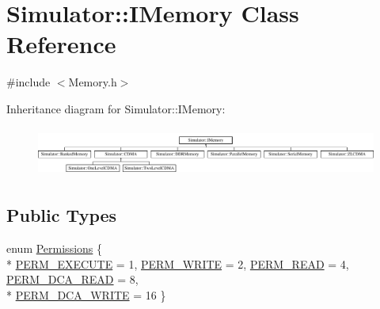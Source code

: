 \hypertarget{class_simulator_1_1_i_memory}{\section{Simulator\+:\+:I\+Memory Class Reference}
\label{class_simulator_1_1_i_memory}
}


{\ttfamily \#include $<$Memory.\+h$>$}

Inheritance diagram for Simulator\+:\+:I\+Memory\+:\begin{figure}[H]
\begin{center}
\leavevmode
\includegraphics[height=1.637427cm]{class_simulator_1_1_i_memory}
\end{center}
\end{figure}
\subsection*{Public Types}
\begin{DoxyCompactItemize}
\item 
enum \hyperlink{class_simulator_1_1_i_memory_a2d5e2d6d674595532297c0436f15651c}{Permissions} \{ \\*
\hyperlink{class_simulator_1_1_i_memory_a2d5e2d6d674595532297c0436f15651ca2b6027913bbb1c49616eb2197f72b311}{P\+E\+R\+M\+\_\+\+E\+X\+E\+C\+U\+T\+E} = 1, 
\hyperlink{class_simulator_1_1_i_memory_a2d5e2d6d674595532297c0436f15651ca332351c05c633105def26311a1757107}{P\+E\+R\+M\+\_\+\+W\+R\+I\+T\+E} = 2, 
\hyperlink{class_simulator_1_1_i_memory_a2d5e2d6d674595532297c0436f15651caf6dc108cfa343b8c96ddf6a23c00dbd6}{P\+E\+R\+M\+\_\+\+R\+E\+A\+D} = 4, 
\hyperlink{class_simulator_1_1_i_memory_a2d5e2d6d674595532297c0436f15651ca5e4b8b3c8972ba0c000b55674b836a6a}{P\+E\+R\+M\+\_\+\+D\+C\+A\+\_\+\+R\+E\+A\+D} = 8, 
\\*
\hyperlink{class_simulator_1_1_i_memory_a2d5e2d6d674595532297c0436f15651ca3f9cf8d1383c992557f8e20131b471b1}{P\+E\+R\+M\+\_\+\+D\+C\+A\+\_\+\+W\+R\+I\+T\+E} = 16
 \}
\end{DoxyCompactItemize}
